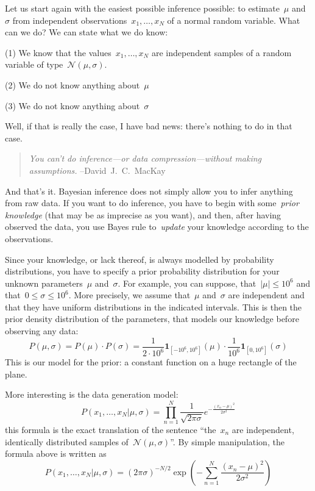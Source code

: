 Let us start again with the easiest possible inference possible: to
estimate~$\mu$ and~$\sigma$ from independent observations~$x_1,\ldots,x_N$ of
a normal random variable.  What can we do?  We can state what we do know:

(1) We know that the values~$x_1,\ldots,x_N$ are independent samples of a
random variable of type~$\mathcal{N}(\mu,\sigma)$.

(2) We do not know anything about~$\mu$

(3) We do not know anything about~$\sigma$

Well, if that is really the case, I have bad news: there's nothing to do in
that case.

\begin{quote}
	\emph{You can't do inference---or data compression---without
	making assumptions.}\newline
	--David~J.~C.~MacKay
\end{quote}

And that's it.  Bayesian inference does not simply allow you to infer
anything from raw data.  If you want to do inference, you have to begin with
some~\emph{prior knowledge} (that may be as imprecise as you want), and then,
after having observed the data, you use Bayes rule to~\emph{update} your
knowledge according to the observations.

Since your knowledge, or lack thereof, is always modelled by probability
distributions, you have to specify a prior probability
distribution for your unknown parameters~$\mu$ and~$\sigma$.  For example,
you can suppose, that~$|\mu|\le10^6$ and
that~$0\le\sigma\le10^6$.  More precisely, we assume that~$\mu$ and~$\sigma$
are independent and that they have uniform distributions in the indicated
intervals.  This is then the prior density distribution of the parameters, that
models our knowledge before observing any data:
$$
P(\mu,\sigma)=P(\mu)\cdot P(\sigma)=
\frac{1}{2\cdot10^6}\mathbf{1}_{\left[-10^6,10^6\right]}(\mu)
\cdot
\frac{1}{10^6}\mathbf{1}_{\left[0,10^6\right]}(\sigma)
$$
This is our model for the prior: a constant function on a huge rectangle of
the plane.

More interesting is the data generation model:
$$
P(x_1,\ldots,x_N|\mu,\sigma)=
\prod_{n=1}^N \frac{1}{\sqrt{2\pi\sigma}}e^{-\frac{(x_n-\mu)^2}{2\sigma^2}}
$$
this formula is the exact translation of the sentence ``the~$x_n$ are
independent, identically distributed samples of~$\mathcal{N}(\mu,\sigma)$''.
By simple manipulation, the formula above is written as
$$
P(x_1,\ldots,x_N|\mu,\sigma)=
(2\pi\sigma)^{-N/2}\exp\left(-\sum_{n=1}^N\frac{(x_n-\mu)^2}{2\sigma^2}\right)
$$

